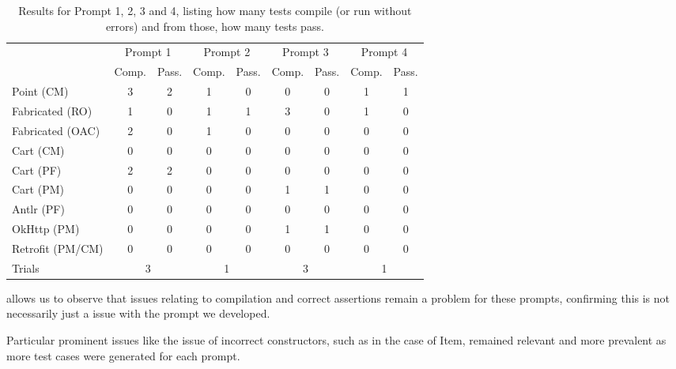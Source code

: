\begin{table}[t]
    \centering
    \begin{tabular}{@{\extracolsep{\fill}} l*{8}{c}} \toprule
                      & \multicolumn{2}{c}{Prompt 1} & \multicolumn{2}{c}{Prompt 2} & \multicolumn{2}{c}{Prompt 3} & \multicolumn{2}{c}{Prompt 4}\\
                      & Comp. & Pass. & Comp. & Pass. & Comp. & Pass. & Comp. & Pass. \\
    \midrule
    Point (CM)       & 3 & 2 & 1 & 0 & 0 & 0 & 1 & 1 \\
    Fabricated (RO)  & 1 & 0 & 1 & 1 & 3 & 0 & 1 & 0 \\
    Fabricated (OAC) & 2 & 0 & 1 & 0 & 0 & 0 & 0 & 0 \\
    Cart (CM)        & 0 & 0 & 0 & 0 & 0 & 0 & 0 & 0 \\
    Cart (PF)        & 2 & 2 & 0 & 0 & 0 & 0 & 0 & 0 \\
    Cart (PM)        & 0 & 0 & 0 & 0 & 1 & 1 & 0 & 0 \\
    Antlr (PF)       & 0 & 0 & 0 & 0 & 0 & 0 & 0 & 0 \\
    OkHttp (PM)      & 0 & 0 & 0 & 0 & 1 & 1 & 0 & 0 \\
    Retrofit (PM/CM) & 0 & 0 & 0 & 0 & 0 & 0 & 0 & 0 \\
    Trials    & \multicolumn{2}{c}{3} & \multicolumn{2}{c}{1} & \multicolumn{2}{c}{3} & \multicolumn{2}{c}{1} \\
    \bottomrule
    \end{tabular}
    \caption{Results for Prompt 1, 2, 3 and 4, listing how many tests compile (or run without errors) and from those, how many tests pass.\label{tab:results:rq3t1}}
\end{table}


 allows us to observe that issues relating to compilation and correct assertions remain
a problem for these prompts, confirming this is not necessarily just a issue with the prompt we developed.

Particular prominent issues like the issue of incorrect constructors, such as in the case of Item, remained relevant
and more prevalent as more test cases were generated for each prompt.


